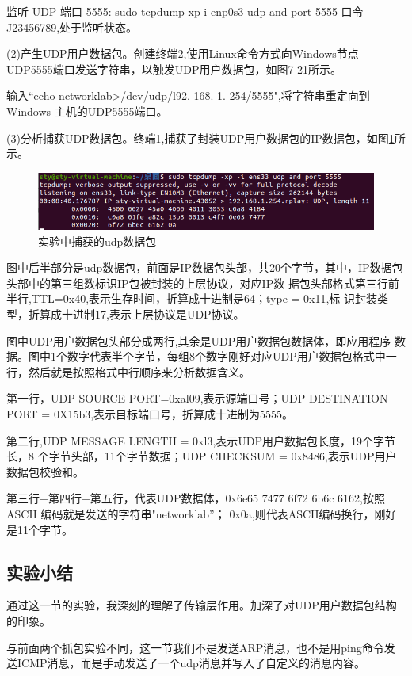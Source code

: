 \documentclass[lang=cn,11pt,a4paper,cite=authoryear]{elegantpaper}
\begin{document}
监听 UDP 端口 5555: sudo tcpdump-xp-i enp0s3 udp and port 5555 口令J23456789,处于监听状态。

(2)产生UDP用户数据包。创建终端2,使用Linux命令方式向Windows节点 UDP5555端口发送字符串，以触发UDP用户数据包，如图7-21所示。

输入“echo networklab>/dev/udp/l92. 168. 1. 254/5555",将字符串重定向到 Windows 主机的UDP5555端口。

(3)分析捕获UDP数据包。终端1,捕获了封装UDP用户数据包的IP数据包，如图\ref{fig:udp}所示。

\begin{figure}[htbp]
	\centering
	\includegraphics[width=\linewidth]{image/udp}
	\caption{实验中捕获的udp数据包}
	\label{fig:udp}
\end{figure}

图中后半部分是udp数据包，前面是IP数据包头部，共20个字节，其中，IP数据包头部中的第三组数标识IP包被封装的上层协议，对应IP数 据包头部格式第三行前半行,TTL=0x40,表示生存时间，折算成十进制是64；type = 0x11,标 识封装类型，折算成十进制17,表示上层协议是UDP协议。

图中UDP用户数据包头部分成两行,其余是UDP用户数据包数据体，即应用程序 数据。图中1个数字代表半个字节，每组8个数字刚好对应UDP用户数据包格式中一 行，然后就是按照格式中行顺序来分析数据含义。

第一行，UDP SOURCE PORT=0xal09,表示源端口号；UDP DESTINATION PORT = 0X15b3,表示目标端口号，折算成十进制为5555。

第二行,UDP MESSAGE LENGTH = 0xl3,表示UDP用户数据包长度，19个字节长，8 个字节头部，11个字节数据；UDP CHECKSUM = 0x8486,表示UDP用户数据包校验和。

第三行+第四行+第五行，代表UDP数据体，0x6e65 7477 6f72 6b6c 6162,按照ASCII  
编码就是发送的字符串"networklab”； 0x0a,则代表ASCII编码换行，刚好是11个字节。


\subsection{实验小结}

通过这一节的实验，我深刻的理解了传输层作用。加深了对UDP用户数据包结构的印象。

与前面两个抓包实验不同，这一节我们不是发送ARP消息，也不是用ping命令发送ICMP消息，而是手动发送了一个udp消息并写入了自定义的消息内容。
\end{document}
